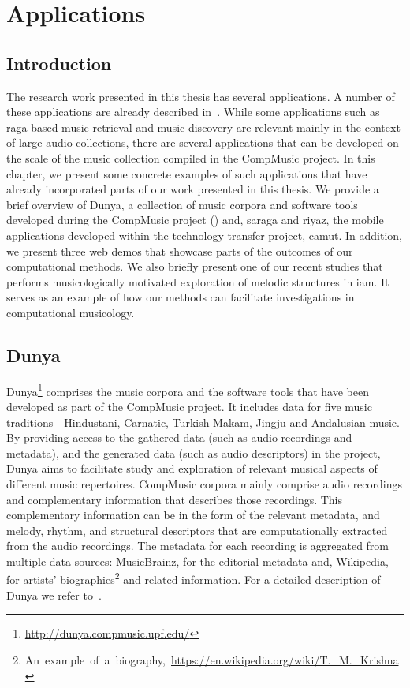 
\chapter{Applications}
\label{chap:applicatoins}

\section{Introduction}
\label{sec:applications_introduction}

The research work presented in this thesis has several applications. A number of these applications are already described in~. While some applications such as \gls{raga}-based music retrieval and music discovery are relevant mainly in the context of large audio collections, there are several applications that can be developed on the scale of the music collection compiled in the CompMusic project. In this chapter, we present some concrete examples of such applications that have already incorporated parts of our work presented in this thesis. We provide a brief overview of Dunya, a collection of music corpora and software tools developed during the CompMusic project () and, \Gls{saraga} and \Gls{riyaz}, the mobile applications developed within the technology transfer project, \gls{camut}. In addition, we present three web demos that showcase parts of the outcomes of our computational methods. We also briefly present one of our recent studies that performs musicologically motivated exploration of melodic structures in \gls{iam}. It serves as an example of how our methods can facilitate investigations in computational musicology.

\section{Dunya}
\label{sec:applications_dunya}

Dunya\footnote{\url{http://dunya.compmusic.upf.edu/}} comprises the music corpora and the software tools that have been developed as part of the CompMusic project. It includes data for five music traditions - Hindustani, Carnatic, Turkish Makam, Jingju and Andalusian music. By providing access to the gathered data (such as audio recordings and metadata), and the generated data (such as audio descriptors) in the project, Dunya aims to facilitate study and exploration of relevant musical aspects of different music repertoires. CompMusic corpora mainly comprise audio recordings and complementary information that describes those recordings. This complementary information can be in the form of the relevant metadata, and melody, rhythm, and structural descriptors that are computationally extracted from the audio recordings. The metadata for each recording is aggregated from multiple data sources: MusicBrainz, for the editorial metadata and, Wikipedia, for artists' biographies\footnote{An~example~of~a~biography,~\url{https://en.wikipedia.org/wiki/T._M._Krishna}} and related information. For a detailed description of Dunya we refer to~\cite{dunya_porter}.


